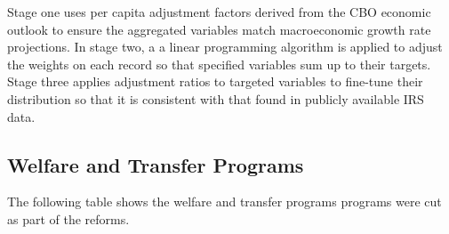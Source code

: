 \documentclass{article}
\begin{document}
Stage one uses per capita adjustment factors derived from the CBO economic outlook to ensure the aggregated variables match macroeconomic growth rate projections. In stage two, a a linear programming algorithm is applied to adjust the weights on each record so that specified variables sum up to their targets. Stage three applies adjustment ratios to targeted variables to fine-tune their distribution so that it is consistent with that found in publicly available IRS data.

\pagebreak
\subsection{Welfare and Transfer Programs}
The following table shows the welfare and transfer programs programs were cut as part of the reforms. 
\end{document}
